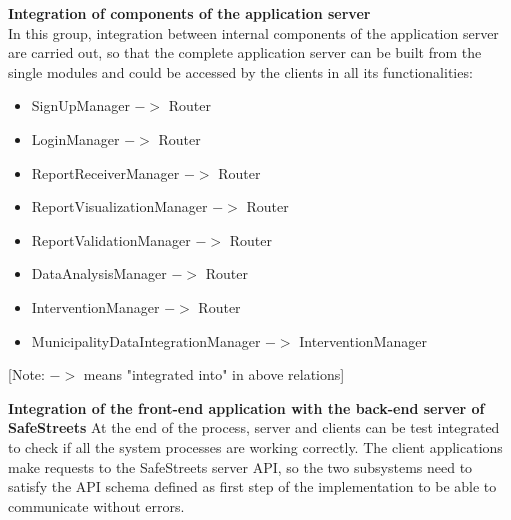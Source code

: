 \textbf{Integration of components of the application server}\\
In this group, integration between internal components of the application server are carried out, so that the complete application server can be built from the single modules and could be accessed by the clients in all its functionalities:
\begin{itemize}
	\item SignUpManager $ -> $ Router
	\item LoginManager $ -> $ Router
	\item ReportReceiverManager $ -> $ Router
	\item ReportVisualizationManager $ -> $ Router
	\item ReportValidationManager $ -> $ Router
	\item DataAnalysisManager $ -> $ Router
	\item InterventionManager $ -> $ Router
	\item MunicipalityDataIntegrationManager $ -> $ InterventionManager
\end{itemize}
[Note: $ -> $ means "integrated into" in above relations]

\textbf{Integration of the front-end application with the back-end server of SafeStreets}
At the end of the process, server and clients can be test integrated to check if all the system processes are working correctly. The client applications make requests to the SafeStreets server API, so the two subsystems need to satisfy the API schema defined as first step of the implementation to be able to communicate without errors.